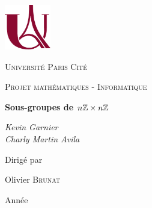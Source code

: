 \documentclass[12pt,a4paper]{report}
\begin{document}
\begin{titlepage}
	\centering
	\includegraphics[width=0.15\textwidth]{logo_upc_small.pdf}\par\vspace{1cm}
	{\textsc{Université Paris Cité} \par}
	\vfill
	{\Large \textsc{Projet mathématiques - Informatique}\par}
	\vspace{1.5cm}
	{\huge\bfseries Sous-groupes de $n\mathbb Z \times n\mathbb Z$\par}
	\vspace{2cm}
	{\Large\itshape Kevin Garnier \\
	Charly Martin Avila\par}
	\vfill
	Dirigé par\par
	Olivier \textsc{Brunat}

	\vfill

	{\large Année \the\year \par}
\end{titlepage}
\end{document}
